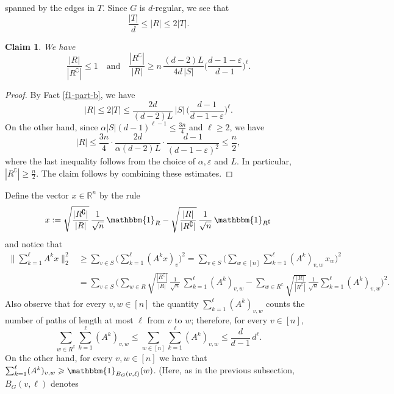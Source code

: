 \documentclass[11pt,leqno]{amsart}
\newtheorem{claim}[theorem]{Claim}
\theoremstyle{remark}
\theoremstyle{plain}
\begin{document}
spanned by the edges in $T$. Since $G$ is $d$-regular, we see that
\[ \frac{|T|}{d} \leqslant |R| \leqslant 2|T|. \]
\begin{claim} \label{cl3-part-b}
We have
\[ \frac{|R|}{|R^\complement|}\leqslant 1 \ \ \ \text{ and } \ \ \
\frac{|R^\complement|}{|R|} \geqslant n\, \frac{(d-2)L}{4d\, |S|} \Big(\frac{d-1-\varepsilon}{d-1}\Big)^\ell. \]
\end{claim}
\begin{proof}
By Fact \ref{f1-part-b}, we have
\[ |R|\leqslant 2|T| \leqslant \frac{2d}{(d-2)L}\, |S|\, \Big(\frac{d-1}{d-1-\varepsilon}\Big)^\ell.\]
On the other hand, since $\alpha|S|(d-1)^{\ell-1}\leqslant \frac{3n}{4}$ and $\ell\geqslant 2$, we have
\[ |R|\leqslant  \frac{3n}{4} \cdot \frac{2d}{\alpha (d-2) L} \cdot \frac{d-1}{(d-1-\varepsilon)^2} \leqslant \frac{n}{2}, \]
where the last inequality  follows from the choice of $\alpha,\varepsilon$ and $L$.
In particular, $|R^\complement| \geqslant \frac{n}{2}$. The claim follows by combining these estimates.
\end{proof}
Define the vector $x\in \mathbb{R}^n$ by the rule
\[ x:= \sqrt{\frac{|R^{\complement}|}{|R|}}\, \frac{1}{\sqrt{n}}\, \mathbbm{1}_{R} -
\sqrt{\frac{|R|}{|R^{\complement}|}}\, \frac{1}{\sqrt{n}}\, \mathbbm{1}_{R^{\complement}} \]
and notice that
\begin{align} \label{eq::01}
\bigg\| \sum_{k=1}^{\ell} A^k x\bigg\|_2^2 &
\geqslant \sum_{v\in S} \bigg(  \sum_{k=1}^{\ell} (A^k x)_v\bigg)^2
= \sum_{v\in S} \bigg( \sum_{w\in [n]} \sum_{k=1}^{\ell} (A^k)_{v,w}\, x_w \bigg)^2  \\
&  = \sum_{v\in S} \bigg( \sum_{w\in R} \sqrt{\frac{|R^\complement|}{|R|}}\, \frac{1}{\sqrt{n}} \,
\sum_{k=1}^{\ell} (A^k)_{v,w} -
\sum_{w\in R^\complement} \sqrt{\frac{|R|}{|R^\complement|}}\, \frac{1}{\sqrt{n}}
\sum_{k=1}^{\ell} (A^k)_{v,w}\bigg)^2.  \nonumber
\end{align}
Also observe that for every $v,w\in [n]$ the quantity $\sum_{k=1}^{\ell} (A^k)_{v,w}$ counts the number of paths
of length at most $\ell$ from $v$ to $w$; therefore, for every $v\in [n]$,
\begin{equation} \label{eq::03}
\sum_{w\in R^\complement}\sum_{k=1}^{\ell} (A^k)_{v,w} \leqslant
\sum_{w\in [n]}\sum_{k=1}^{\ell} (A^k)_{v,w} \leqslant \frac{d}{d-1}\, d^\ell.
\end{equation}
On the other hand, for every $v,w\in [n]$ we have that $\sum_{k=1}^{\ell} (A^k)_{v,w}\geqslant
\mathbbm{1}_{B_G(v,\ell)}(w)$. (Here, as in the previous subsection, $B_G(v,\ell)$ denotes
\end{document}

